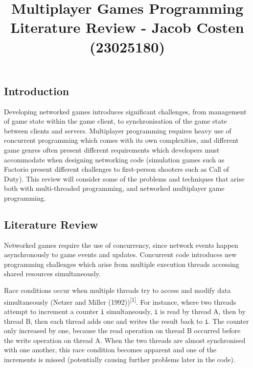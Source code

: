 \documentclass[
]{article}
\title{Multiplayer Games Programming Literature Review - Jacob Costen
(23025180)}
\author{}
\date{}
\begin{document}
\maketitle

\hypertarget{introduction}{%
\subsection{Introduction}\label{introduction}}

Developing networked games introduces significant challenges, from
management of game state within the game client, to synchronisation of
the game state between clients and servers. Multiplayer programming
requires heavy use of concurrent programming which comes with its own
complexities, and different game genres often present different
requirements which developers must accommodate when designing networking
code (simulation games such as Factorio present different challenges to
first-person shooters such as Call of Duty). This review will consider
some of the problems and techniques that arise both with multi-threaded
programming, and networked multiplayer game programming.

\hypertarget{literature-review}{%
\subsection{Literature Review}\label{literature-review}}

Networked games require the use of concurrency, since network events
happen asynchronously to game events and updates. Concurrent code
introduces new programming challenges which arise from multiple
execution threads accessing shared resources simultaneously.

Race conditions occur when multiple threads try to access and modify
data simultaneously (Netzer and Miller (1992))\textsuperscript{{[}1{]}}.
For instance, where two threads attempt to increment a counter
\texttt{i} simultaneously, \texttt{i} is read by thread A, then by
thread B, then each thread adds one and writes the result back to
\texttt{i}. The counter only increased by one, because the read
operation on thread B occurred before the write operation on thread A.
When the two threads are almost synchronised with one another, this race
condition becomes apparent and one of the increments is missed
(potentially causing further problems later in the code).
\end{document}
